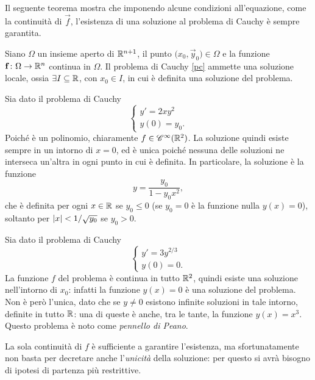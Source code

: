 Il seguente teorema mostra che imponendo alcune condizioni all'equazione, come la continuità di $\vec f$, l'esistenza di una soluzione al problema di Cauchy è sempre garantita.
\begin{teorema}[Peano]
Siano $\Omega$ un insieme aperto di $\R^{n+1}$, il punto $\big(x_0,\vec y_0)\in\Omega$ e la funzione $\vec f\colon\Omega\to\R^n$ continua in $\Omega$. Il problema di Cauchy \eqref{pc} ammette una soluzione locale, ossia $\exists I\subseteq\R$, con $x_0\in I$, in cui è definita una soluzione del problema.
\end{teorema}
\begin{esempio} \label{es:problema-cauchy-unicita}
	Sia dato il problema di Cauchy
	\[\begin{cases}y'=2xy^2\\y(0)=y_0.\end{cases}\]
	Poiché è un polinomio, chiaramente $f\in\cont[\infty]{\R^2}$. La soluzione quindi esiste sempre in un intorno di $x=0$, ed è unica poiché nessuna delle soluzioni ne interseca un'altra in ogni punto in cui è definita. In particolare, la soluzione è la funzione
	\[
	y=\frac{y_0}{1-y_0x^2},
	\]
	che è definita per ogni $x\in\R$ se $y_0\leq 0$ (se $y_0=0$ è la funzione nulla $y(x)=0$), soltanto per $\abs{x}<1/\sqrt{y_0}$ se $y_0>0$.
\end{esempio}
\begin{esempio} \label{es:pennello-peano}
	Sia dato il problema di Cauchy
	\[\begin{cases}y'=3y^{2/3}\\y(0)=0.\end{cases}\]
	La funzione $f$ del problema è continua in tutto $\R^2$, quindi esiste una soluzione nell'intorno di $x_0$: infatti la funzione $y(x)=0$ è una soluzione del problema. Non è però l'unica, dato che se $y\neq 0$ esistono infinite soluzioni in tale intorno, definite in tutto $\R$: una di queste è anche, tra le tante, la funzione $y(x)=x^3$. Questo problema è noto come \emph{pennello di Peano}.
\end{esempio}
La sola continuità di $f$ è sufficiente a garantire l'esistenza, ma sfortunatamente non basta per decretare anche l'\emph{unicità} della soluzione: per questo si avrà bisogno di ipotesi di partenza più restrittive.

